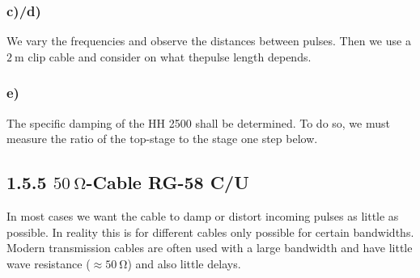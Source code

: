 \subsubsection{c)/d)}
We vary the frequencies and observe the distances between pulses. Then we use a $\SI{2}{\meter}$ clip cable and consider on what thepulse length depends.
\subsubsection{e)}
 The specific damping of the HH 2500 shall be determined. To do so, we must measure the ratio of the top-stage to the stage one step below.
\subsection{1.5.5 $\SI{50}{\ohm}$-Cable RG-58 C/U}
In most cases we want the cable to damp or distort incoming pulses as little as possible. In reality this is for different cables only possible for certain bandwidths.\\
Modern transmission cables are often used with a large bandwidth and have little wave resistance ($\approx\SI{50}{\ohm}$) and also little delays.